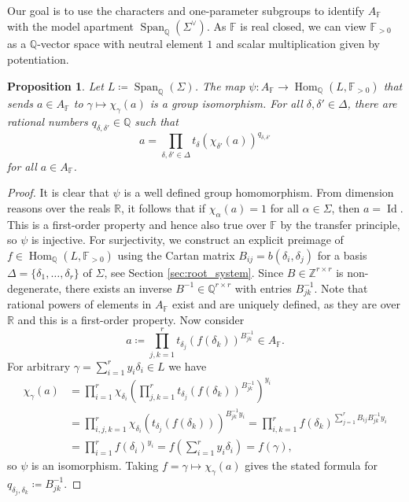 \documentclass[12pt]{amsart}
\newcommand{\F}{\mathbb{F} }
\newcommand{\R}{\mathbb{R} }
\newcommand{\Q}{\mathbb{Q} }
\newcommand{\Z}{\mathbb{Z} }
\numberwithin{equation}{section}
\newtheorem{proposition}[theorem]{Proposition}
\theoremstyle{remark} %
\begin{document}
Our goal is to use the characters and one-parameter subgroups to identify $A_\F$ with the model apartment $\operatorname{Span}_{\Q}(\Sigma^\vee)$. As $\F$ is real closed, we can view $\F_{>0}$ as a $\Q$-vector space with neutral element $1$ and scalar multiplication given by potentiation.
\begin{proposition}\label{prop:apt0}
	Let $L \coloneqq \operatorname{Span}_{\mathbb{Q}}(\Sigma)$. The map $\psi \colon A_\F \to \operatorname{Hom}_{\mathbb{Q}}(L,\F_{>0})$ that sends $a\in A_\F$ to $\gamma \mapsto \chi_\gamma(a)$ is a group isomorphism. For all $\delta, \delta' \in \Delta$, there are rational numbers $q_{\delta,\delta'} \in \Q$ such that 
	$$
	a = \prod_{\delta, \delta' \in \Delta} t_\delta (\chi_{\delta'}(a))^{q_{\delta,\delta'}}
	$$
	for all $a \in A_\F$.
\end{proposition}
\begin{proof}
	It is clear that $\psi$ is a well defined group homomorphism. From dimension reasons over the reals $\R$, it follows that if $\chi_\alpha(a)=1$ for all $\alpha \in \Sigma$, then $a=\operatorname{Id}$. This is a first-order property and hence also true over $\F$ by the transfer principle, so $\psi$ is injective. For surjectivity, we construct an explicit preimage of $f\in \operatorname{Hom}_{\Q}(L,\F_{>0})$ using the Cartan matrix $B_{ij} = b(\delta_i, \delta_j)$ for a basis $\Delta = \{\delta_1, \ldots, \delta_r\}$ of $\Sigma$, see Section \ref{sec:root_system}. Since $B\in \Z^{r \times r}$ is non-degenerate, there exists an inverse $B^{-1} \in \Q^{r \times r}$ with entries $B_{jk}^{-1}$. Note that rational powers of elements in $A_\F$ exist and are uniquely defined, as they are over $\R$ and this is a first-order property. Now consider %
	$$
	a \coloneqq \prod_{j,k = 1}^r t_{\delta_j}(f(\delta_k ))^{B_{jk}^{-1}} \in A_\F.
	$$
    For arbitrary $\gamma = \sum_{i=1}^r y_i \delta_i \in L$ we have
    \begin{align*}
    	\chi_{\gamma}\left(a \right) &= \prod_{i=1}^r  \chi_{\delta_i}\left( \prod_{j,k=1}^r t_{\delta_j}(f(\delta_k))^{B_{jk}^{-1}} \right)^{y_i} \\
    	&= \prod_{i,j,k=1}^r \chi_{\delta_i}\left(t_{\delta_j}(f(\delta_k)) \right)^{ B_{jk}^{-1} y_i }  
    	= \prod_{i,k=1}^r f(\delta_k)^{\sum_{j=1}^r B_{ij}B_{jk}^{-1} y_i} \\
    	&= \prod_{i=1}^r f(\delta_i)^{y_i} =   f\left( \sum_{i=1}^r y_i \delta_i \right) = f(\gamma),
    \end{align*}
    so $\psi$ is an isomorphism. Taking $f= \gamma \mapsto \chi_{\gamma}(a)$ gives the stated formula for $q_{\delta_j,\delta_k} \coloneq B_{jk}^{-1}$.
\end{proof}
\end{document}
